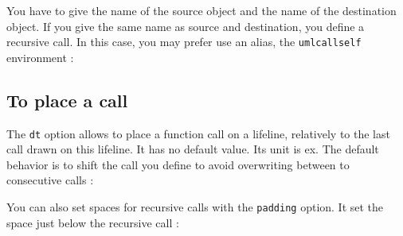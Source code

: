 \documentclass[a4paper,11pt]{report}
\newcommand{\inputTikZ}[1]{%
  }%
\newcommand{\inputTikZ}[1]{%
    \texttt{[image: fig/\#1.pdf]}%
  }%
\begin{document}
\begin{minipage}{0.4\textwidth}

\end{minipage}
\begin{minipage}{0.6\textwidth}
\begin{center}
\inputTikZ{call}
\end{center}
\end{minipage}

\medskip

You have to give the name of the source object and the name of the destination object. If you give the same name as source and destination, you define a recursive call. In this case, you may prefer use an alias, the {\tt umlcallself} environment :

\medskip

\begin{minipage}{0.5\textwidth}

\end{minipage}
\begin{minipage}{0.5\textwidth}
\begin{center}
\inputTikZ{callself}
\end{center}
\end{minipage}

\subsection{To place a call}\label{ss.calldt}

The {\tt dt} option allows to place a function call on a lifeline, relatively to the last call drawn on this lifeline. It has no default value. Its unit is ex. The default behavior is to shift the call you define to avoid overwriting between to consecutive calls :

\medskip

\begin{minipage}{0.5\textwidth}

\end{minipage}
\begin{minipage}{0.5\textwidth}
\begin{center}
\inputTikZ{calldt}
\end{center}
\end{minipage}

\medskip

You can also set spaces for recursive calls with the {\tt padding} option. It set the space just below the recursive call :

\medskip
\end{document}

